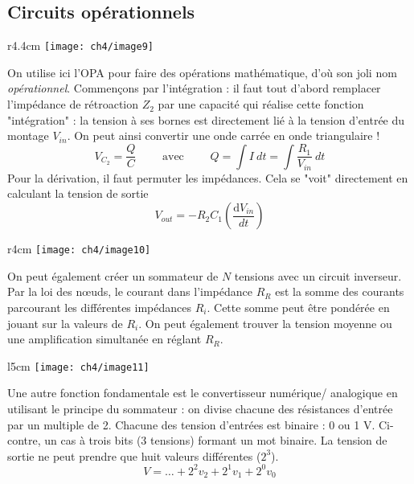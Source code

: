 	\subsection{Circuits opérationnels}
	\begin{wrapfigure}[9]{r}{4.4cm}
	\vspace{-1.2cm}
	\texttt{[image: ch4/image9]}
	\end{wrapfigure}
	On utilise ici l'OPA pour faire des opérations mathématique, d'où son 
	joli nom \textit{opérationnel}. Commençons par l'intégration : il faut 
	tout d'abord remplacer l'impédance de rétroaction $Z_2$ par une 
	capacité qui réalise cette fonction "intégration" : la tension à ses 
	bornes est directement lié à la tension d'entrée du montage $V_{in}$. 
	On peut ainsi convertir une onde carrée en onde triangulaire ! 
	\begin{equation}
	V_{C_2} = \dfrac{Q}{C}\qquad \text{ avec }\qquad Q = \int I\ dt = \int 
	\dfrac{R_1}{V_{in}}\ dt
	\end{equation}		
	\newpage
	Pour la 
	dérivation, il faut permuter les impédances. Cela se "voit" directement 
	en calculant la tension de sortie
	\begin{equation}
	V_{out} = -R_2C_1\left(\dfrac{\text{d}V_{in}}{dt}\right)
	\end{equation}
		\begin{wrapfigure}[7]{r}{4cm}
	\vspace{-0.5cm}
	\texttt{[image: ch4/image10]}
	\end{wrapfigure}
	On peut également créer un sommateur de $N$ tensions avec un circuit 
	inverseur. Par la loi des nœuds, le courant dans l'impédance $R_R$ est 
	la somme des courants parcourant les différentes impédances $R_i$. Cette 
	somme peut être pondérée en jouant sur la valeurs de $R_i$. On peut 
	également trouver la tension moyenne ou une amplification simultanée en 
	réglant $R_R$.\\
	
	\begin{wrapfigure}[9]{l}{5cm}
	\vspace{-0.5cm}
	\texttt{[image: ch4/image11]}
	\end{wrapfigure}
	Une autre fonction fondamentale est le convertisseur numérique/
	analogique	en utilisant le principe du sommateur : on divise chacune des 
	résistances d'entrée par un multiple de 2. Chacune des tension d'entrées 
	est binaire : 0 ou 1 V. Ci-contre, un cas à trois bits (3 tensions) formant un 
	mot binaire. La tension de sortie ne peut prendre que huit valeurs différentes ($2^3$).
	\begin{equation}
	V = \dots + 2^2 v_2 + 2^1v_1 + 2^0 v_0
	\end{equation}
	

